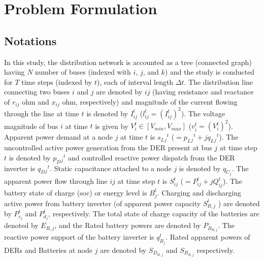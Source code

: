 \documentclass{article}
\begin{document}
\section{Problem Formulation}

\subsection{Notations}
In this study, the distribution network is accounted as a tree (connected graph) having \(N\) number of buses (indexed with \(i\), \(j\), and \(k\)) and the study is conducted for \(T\) time steps (indexed by \(t\)), each of interval length $\Delta t$. The distribution line connecting two buses \(i\) and \(j\) are denoted by {\(ij\)} (having resistance and reactance of \(r_{ij}\) ohm and \(x_{ij}\) ohm, respectively) and magnitude of the current flowing through the line at time \(t\) is denoted by \(I_{ij}^t\) (\(l_{ij}^t=\left(I_{ij}^t\right)^2\)). The voltage magnitude of bus \(i\) at time \(t\) is given by \(V_i^t \in [V_{min},V_{max}]\) (\(v_i^t=\left(V_i^t\right)^2\)). Apparent power demand at a node \(j\) at time \(t\) is \(s_L{_j}^t\) (\(=p_L{_j}^t+\textit{j}q_L{_j}^t\)). The uncontrolled active power generation from the DER present at bus \(j\) at time step \(t\) is denoted by \(p_D{_j}^t\) and controlled reactive power dispatch from the DER inverter is \(q_D{_j}^t\). Static capacitance attached to a node $j$ is denoted by $q_{C_{j}}$. The apparent power flow through line {\(ij\)} at time step \(t\) is \(S_{ij}^t\) (\(=P_{ij}^t+\textit{j}Q_{ij}^t\)). The battery state of charge (soc) or energy level is \(B_j^t\). Charging and discharging active power from battery inverter (of apparent power capacity \(S^{t}_{R, j}\) ) are denoted by \(P_{c_j}^t\) and \(P_{d_j}^t\), respectively. The total state of charge capacity of the batteries are denoted by $E_{R, j}$, and the Rated battery powers are denoted by $P_{B_{R, j}}$. The reactive power support of the battery inverter is \(q_{B_j}^t\). Rated apparent powers of DERs and Batteries at node $j$ are denoted by $S_{D_{R, j}}$ and $S_{B_{R, j}}$ respectively.
\end{document}
